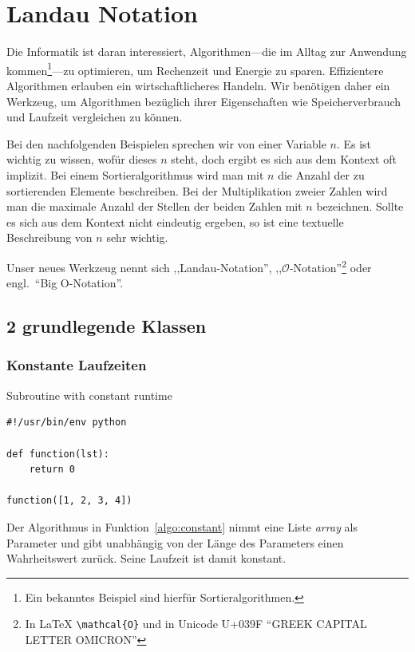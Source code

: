 \chapter{Landau Notation}
%
Die Informatik ist daran interessiert, Algorithmen---die im Alltag zur Anwendung kommen\footnote{Ein bekanntes Beispiel sind hierfür Sortieralgorithmen.}---zu optimieren, um Rechenzeit und Energie zu sparen. Effizientere Algorithmen erlauben ein wirtschaftlicheres Handeln. Wir benötigen daher ein Werkzeug, um Algorithmen bezüglich ihrer Eigenschaften wie Speicherverbrauch und Laufzeit vergleichen zu können.

Bei den nachfolgenden Beispielen sprechen wir von einer Variable $n$. Es ist wichtig zu wissen, wofür dieses $n$ steht, doch ergibt es sich aus dem Kontext oft implizit. Bei einem Sortieralgorithmus wird man mit $n$ die Anzahl der zu sortierenden Elemente beschreiben. Bei der Multiplikation zweier Zahlen wird man die maximale Anzahl der Stellen der beiden Zahlen mit $n$ bezeichnen. Sollte es sich aus dem Kontext nicht eindeutig ergeben, so ist eine textuelle Beschreibung von $n$ sehr wichtig.

Unser neues Werkzeug nennt sich ,,Landau-Notation'', ,,$\mathcal{O}$-Notation''\footnote{In \LaTeX{}  \texttt{\textbackslash mathcal\{O\}} und in Unicode U+039F ``GREEK CAPITAL LETTER OMICRON''} oder engl.~``Big O-Notation''.

\section{2 grundlegende Klassen}
\subsection{Konstante Laufzeiten}
%
\begin{algorithm}[p]
\caption{Subroutine with constant runtime}
\label{algo:constant}
\begin{lstlisting}
#!/usr/bin/env python

def function(lst):
    return 0

function([1, 2, 3, 4])
\end{lstlisting}
\end{algorithm}

Der Algorithmus in Funktion~\ref{algo:constant} nimmt eine Liste \textit{array} als Parameter und gibt unabhängig von der Länge des Parameters einen Wahrheitswert zurück. Seine Laufzeit ist damit konstant.

